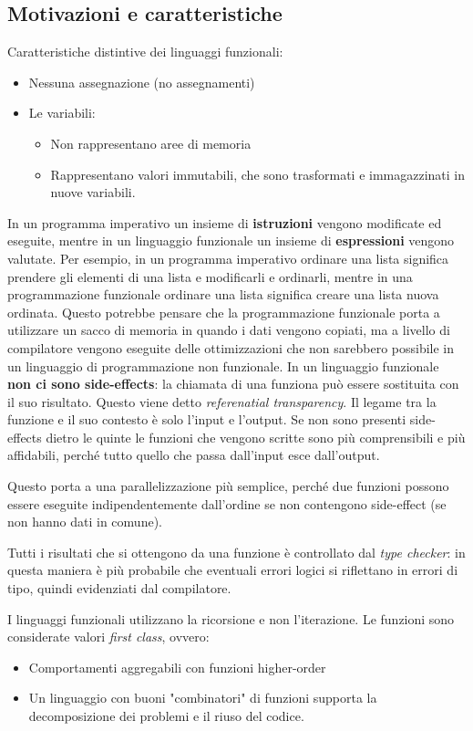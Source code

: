 \subsection{Motivazioni e caratteristiche}
Caratteristiche distintive dei linguaggi funzionali:
\begin{itemize}
  \item Nessuna assegnazione (no assegnamenti)
  \item Le variabili:
  \begin{itemize}
    \item Non rappresentano aree di memoria
    \item Rappresentano valori immutabili, che sono trasformati e immagazzinati
in nuove variabili.
  \end{itemize}
\end{itemize}

In un programma imperativo un insieme di \textbf{istruzioni} vengono modificate
ed eseguite, mentre in un linguaggio funzionale un insieme di
\textbf{espressioni} vengono valutate.
Per esempio, in un programma imperativo ordinare una lista significa prendere
gli elementi di una lista e modificarli e ordinarli, mentre in una
programmazione funzionale ordinare una lista significa creare una lista nuova
ordinata. Questo potrebbe pensare che la programmazione funzionale porta a
utilizzare un sacco di memoria in quando i dati vengono copiati, ma a livello
di compilatore vengono eseguite delle ottimizzazioni che non sarebbero
possibile in un linguaggio di programmazione non funzionale.
In un linguaggio funzionale \textbf{non ci sono side-effects}: la chiamata di
una funziona può essere sostituita con il suo risultato. Questo viene detto
\textit{referenatial transparency}. Il legame tra la funzione e il suo contesto
è solo l'input e l'output. Se non sono presenti side-effects dietro le quinte
le funzioni che vengono scritte sono più comprensibili e più affidabili, perché
tutto quello che passa dall'input esce dall'output.

Questo porta a una parallelizzazione più semplice, perché due funzioni possono
essere eseguite indipendentemente dall'ordine se non contengono side-effect
(se non hanno dati in comune).

Tutti i risultati che si ottengono da una funzione è controllato dal
\textit{type checker}: in questa maniera è più probabile che eventuali errori
logici si riflettano in errori di tipo, quindi evidenziati dal compilatore.

I linguaggi funzionali utilizzano la ricorsione e non l'iterazione. Le funzioni
sono considerate valori \textit{first class}, ovvero:
\begin{itemize}
  \item Comportamenti aggregabili con funzioni higher-order
  \item Un linguaggio con buoni "combinatori" di funzioni supporta la
decomposizione dei problemi e il riuso del codice.
\end{itemize}

